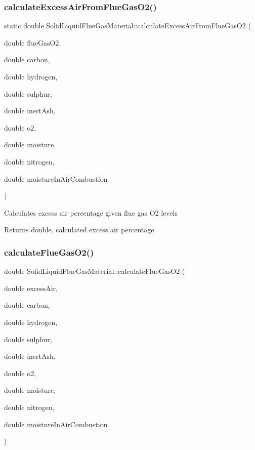 \subsubsection{\texorpdfstring{calculate\+Excess\+Air\+From\+Flue\+Gas\+O2()}{calculateExcessAirFromFlueGasO2()}\hspace{0.1cm}{\footnotesize\ttfamily [3/3]}}
{\footnotesize\ttfamily static double Solid\+Liquid\+Flue\+Gas\+Material\+::calculate\+Excess\+Air\+From\+Flue\+Gas\+O2 (\begin{DoxyParamCaption}\item[{double}]{flue\+Gas\+O2,  }\item[{double}]{carbon,  }\item[{double}]{hydrogen,  }\item[{double}]{sulphur,  }\item[{double}]{inert\+Ash,  }\item[{double}]{o2,  }\item[{double}]{moisture,  }\item[{double}]{nitrogen,  }\item[{double}]{moisture\+In\+Air\+Combustion }\end{DoxyParamCaption})\hspace{0.3cm}{\ttfamily [static]}}

Calculates excess air percentage given flue gas O2 levels \begin{DoxyReturn}{Returns}
double, calculated excess air percentage 
\end{DoxyReturn}
\mbox{\label{class_solid_liquid_flue_gas_material_a39dbc6f412ce2ec739ed8107fbdc68a7}} 
\subsubsection{\texorpdfstring{calculate\+Flue\+Gas\+O2()}{calculateFlueGasO2()}\hspace{0.1cm}{\footnotesize\ttfamily [1/3]}}
{\footnotesize\ttfamily double Solid\+Liquid\+Flue\+Gas\+Material\+::calculate\+Flue\+Gas\+O2 (\begin{DoxyParamCaption}\item[{double}]{excess\+Air,  }\item[{double}]{carbon,  }\item[{double}]{hydrogen,  }\item[{double}]{sulphur,  }\item[{double}]{inert\+Ash,  }\item[{double}]{o2,  }\item[{double}]{moisture,  }\item[{double}]{nitrogen,  }\item[{double}]{moisture\+In\+Air\+Combustion }\end{DoxyParamCaption})\hspace{0.3cm}{\ttfamily [static]}}

